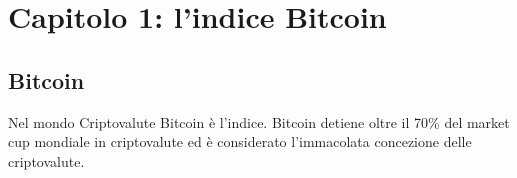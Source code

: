 \chapter{Capitolo 1: l'indice Bitcoin}

\section{Bitcoin}
Nel mondo Criptovalute Bitcoin è l'indice. Bitcoin detiene oltre il 70\% del market cup mondiale in criptovalute ed è considerato l'immacolata concezione delle criptovalute.